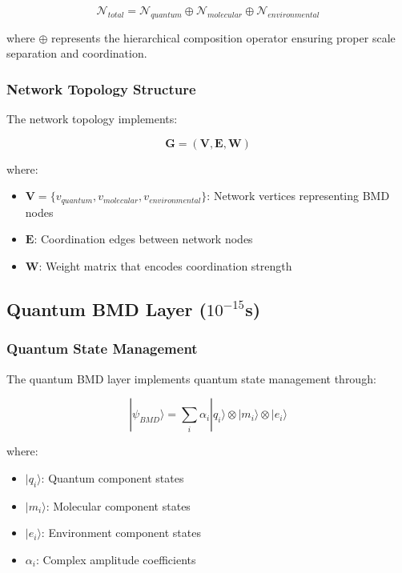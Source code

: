 \documentclass[12pt,a4paper]{article}
\begin{document}
\begin{equation}
\mathcal{N}_{total} = \mathcal{N}_{quantum} \oplus \mathcal{N}_{molecular} \oplus \mathcal{N}_{environmental}
\end{equation}

where $\oplus$ represents the hierarchical composition operator ensuring proper scale separation and coordination.

\subsubsection{Network Topology Structure}

The network topology implements:

\begin{equation}
\mathbf{G} = (\mathbf{V}, \mathbf{E}, \mathbf{W})
\end{equation}

where:
\begin{itemize}
\item $\mathbf{V} = \{v_{quantum}, v_{molecular}, v_{environmental}\}$: Network vertices representing BMD nodes
\item $\mathbf{E}$: Coordination edges between network nodes
\item $\mathbf{W}$: Weight matrix that encodes coordination strength
\end{itemize}

\subsection{Quantum BMD Layer (\texorpdfstring{$10^{-15}$}{10^{-15}}s)}

\subsubsection{Quantum State Management}

The quantum BMD layer implements quantum state management through:

\begin{equation}
|\psi_{BMD}\rangle = \sum_{i} \alpha_i |q_i\rangle \otimes |m_i\rangle \otimes |e_i\rangle
\end{equation}

where:
\begin{itemize}
\item $|q_i\rangle$: Quantum component states
\item $|m_i\rangle$: Molecular component states  
\item $|e_i\rangle$: Environment component states
\item $\alpha_i$: Complex amplitude coefficients
\end{itemize}
\end{document}
